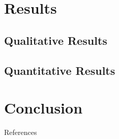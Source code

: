 \documentclass[10pt,frenchb]{beamer}
\begin{document}
\section{Results}

\subsection{Qualitative Results}


\begin{frame}


\end{frame}

\subsection{Quantitative Results}

\begin{frame}


\end{frame}

\section{Conclusion}

 \begin{frame}


\end{frame}

\begin{frame}[allowframebreaks]{References}
 

\end{frame}
\end{document}
